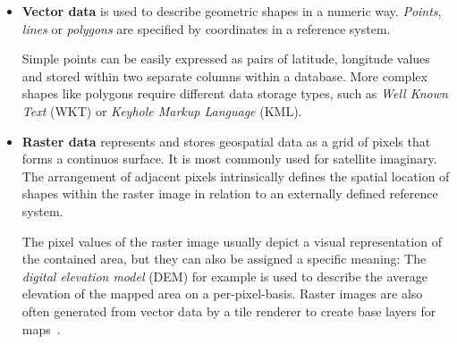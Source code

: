 \begin{itemize}

\item \textbf{Vector data} is used to describe geometric shapes in a numeric way. \textit{Points}, \textit{lines} or \textit{polygons} are specified by coordinates in a reference system.

Simple points can be easily expressed as pairs of latitude, longitude values and stored within two separate columns within a database. More complex shapes like polygons require different data storage types, such as \textit{Well Known Text} (WKT) or \textit{Keyhole Markup Language} (KML).

\item \textbf{Raster data} represents and stores geospatial data as a grid of pixels that forms a continuos surface. It is most commonly used for satellite imaginary. The arrangement of adjacent pixels intrinsically defines the spatial location of shapes within the raster image in relation to an externally defined reference system.

The pixel values of the raster image usually depict a visual representation of the contained area, but they can also be assigned a specific meaning: The \textit{digital elevation model} (DEM) for example is used to describe the average elevation of the mapped area on a per-pixel-basis. Raster images are also often generated from vector data by a tile renderer to create base layers for maps~\cite{Kupper2005lbs, Zzolo11mappingdrupal}.

\end{itemize}





